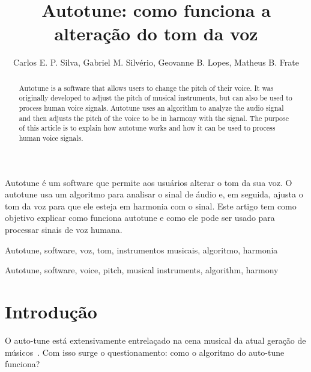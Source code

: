 \documentclass{sbrt}
\begin{document}
\title{Autotune: como funciona a alteração do tom da voz}

\author{Carlos E. P. Silva, Gabriel M. Silvério, Geovanne B. Lopes, Matheus B. Frate}

\maketitle


\begin{resumo}
Autotune é um software que permite aos usuários alterar o tom da sua voz. O autotune usa um algoritmo para analisar o
sinal de áudio e, em seguida, ajusta o tom da voz para que ele esteja em harmonia com o sinal. Este artigo tem como
objetivo explicar como funciona autotune e como ele pode ser usado para processar sinais de voz humana.
\end{resumo}
\begin{chave}
Autotune, software, voz, tom, instrumentos musicais, algoritmo, harmonia
\end{chave}


\begin{abstract}
Autotune is a software that allows users to change the pitch of their voice. It was originally developed to adjust the
pitch of musical instruments, but can also be used to process human voice signals. Autotune uses an algorithm to analyze
the audio signal and then adjusts the pitch of the voice to be in harmony with the signal. The purpose of this article
is to explain how autotune works and how it can be used to process human voice signals.
\end{abstract}
\begin{keywords}
Autotune, software, voice, pitch, musical instruments, algorithm, harmony
\end{keywords}


\section{Introdução}

O auto-tune está extensivamente entrelaçado na cena musical da atual geração de músicos~\cite{diaz2009fate}. Com isso
surge o questionamento: como o algoritmo do auto-tune funciona?
\end{document}
